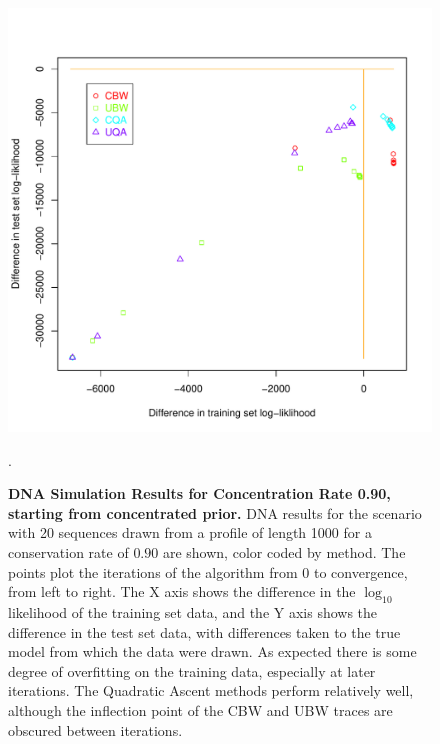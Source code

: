 \documentclass[preprint,12pt,authoryear]{elsarticle}
\begin{document}
\begin{figure}[htp]
\centering
\includegraphics[scale=.85]{DNA_priorstart_results_90.pdf}
\caption{\textbf{DNA Simulation Results for Concentration Rate 0.90, starting from concentrated prior.}  DNA results for the scenario with 20 sequences drawn from a profile of length 1000 for a conservation rate of $0.90$ are shown, color coded by method.  The points plot the iterations of the algorithm from 0 to convergence, from left to right.  The X axis shows the difference in the $\log_{10}$ likelihood of the training set data, and the Y axis shows the difference in the test set data, with differences taken to the true model from which the data were drawn.  As expected there is some degree of overfitting on the training data, especially at later iterations. The Quadratic Ascent methods perform relatively well, although the inflection point of the CBW and UBW traces are obscured between iterations.}.
\label{fig:DNA_priorstart_results_90}
\end{figure}
\end{document}
